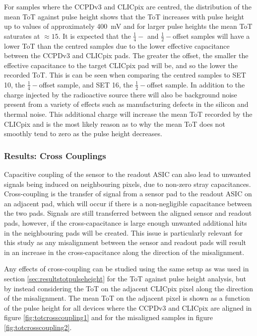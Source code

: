 For samples where the CCPDv3 and CLICpix are centred, the distribution of the mean ToT against pulse height shows that the ToT increases with pulse height up to values of approximately 400~mV and for larger pulse heights the mean ToT saturates at $\approx 15$.  It is expected that the $\frac{1}{4}-$ and $\frac{1}{2}-$offset samples will have a lower ToT than the centred samples due to the lower effective capacitance between the CCPDv3 and CLICpix pads.  The greater the offset, the smaller the effective capacitance to the target CLICpix pad will be, and so the lower the recorded ToT.  This is can be seen when comparing the centred samples to SET 10, the $\frac{1}{4}-$offset sample, and SET 16, the $\frac{1}{2}-$offset sample.  In addition to the charge injected by the radioactive source there will also be background noise present from a variety of effects such as manufacturing defects in the silicon and thermal noise.  This additional charge will increase the mean ToT recorded by the CLICpix and is the most likely reason as to why the mean ToT does not smoothly tend to zero as the pulse height decreases.


\subsubsection{Results: Cross Couplings}
Capacitive coupling of the sensor to the readout ASIC can also lead to unwanted signals being induced on neighbouring pixels, due to non-zero stray capacitances. Cross-coupling is the transfer of signal from a sensor pad to the readout ASIC on an adjacent pad, which will occur if there is a non-negligible capacitance between the two pads.  Signals are still transferred between the aligned sensor and readout pads, however, if the cross-capacitance is large enough unwanted additional hits in the neighbouring pads will be created.  This issue is particularly relevant for this study as any misalignment between the sensor and readout pads will result in an increase in the cross-capacitance along the direction of the misalignment.   

Any effects of cross-coupling can be studied using the same setup as was used in section \ref{sec:resultstotpulseheight} for the ToT against pulse height analysis, but by instead considering the ToT on the adjacent CLICpix pixel along the direction of the misalignment.  The mean ToT on the adjacent pixel is shown as a function of the pulse height for all devices where the CCPDv3 and CLICpix are aligned in figure \ref{fig:totcrosscoupling1} and for the misaligned samples in figure \ref{fig:totcrosscoupling2}.

